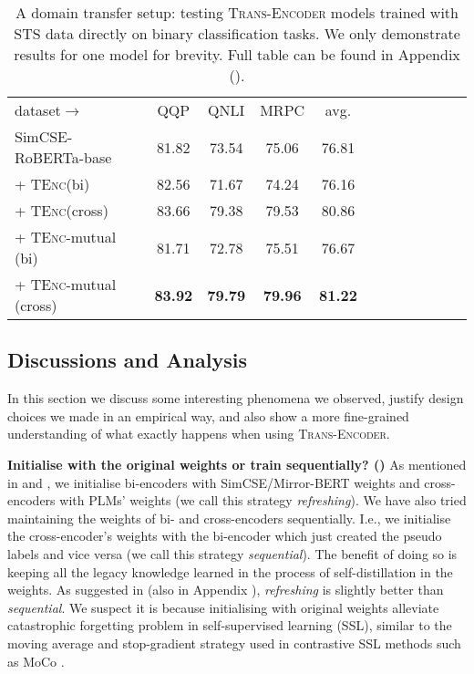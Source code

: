 \documentclass{article} \usepackage{iclr2021_conference,times}
\newcommand{\modelname}{\textsc{Trans-Encoder}\xspace}
\newcommand{\tenc}{\textsc{TEnc}\xspace}
\begin{document}
\begin{table}[!t] \centering
\begin{tabular}{lccccccccccc}
\cmidrule[1.5pt]{1-10}
 dataset$\rightarrow$  & QQP & QNLI & MRPC & avg.\\
\cmidrule[1.0pt]{1-10}
  SimCSE-RoBERTa-base & 81.82 & 73.54 & 75.06 & 76.81  \\
 + \tenc (bi) & 82.56 & 71.67 & 74.24 & 76.16 \\
   + \tenc (cross) & 83.66 & 79.38 & 79.53 & 80.86 \\
    \rowcolor{blue!5}
  + \tenc-mutual (bi) & 81.71 & 72.78 & 75.51 & 76.67 \\
    \rowcolor{blue!5}
 + \tenc-mutual (cross) & \textbf{83.92} & \textbf{79.79} & \textbf{79.96} & \textbf{81.22} \\
  \cmidrule[1.5pt]{1-10}
\end{tabular}
\vspace{-1mm}
\caption{A domain transfer setup: testing \modelname models trained with STS data directly on binary classification tasks. We only demonstrate results for one model for brevity. Full table can be found in Appendix ().}
\label{tab:binary_transfer}
\vspace{-2.0mm}
\end{table}



\subsection{Discussions and Analysis}\label{sec:discuss_and_analysis}

In this section we discuss some interesting phenomena we observed, justify design choices we made in an empirical way, and also show a more fine-grained understanding of what exactly happens when using \modelname. 

\textbf{Initialise with the original weights or train sequentially? ()} As mentioned in  and , we initialise bi-encoders with SimCSE/Mirror-BERT weights and cross-encoders with PLMs' weights (we call this strategy \textit{refreshing}). We have also tried maintaining the weights of bi- and cross-encoders sequentially. I.e., we initialise the cross-encoder's weights with the bi-encoder which just created the pseudo labels and vice versa (we call this strategy \textit{sequential}). The benefit of doing so is keeping all the legacy knowledge learned in the process of self-distillation in the weights. As suggested in  (also in Appendix ), \textit{refreshing} is slightly better than \textit{sequential}. We suspect it is because initialising with original weights alleviate catastrophic forgetting problem in self-supervised learning (SSL), similar to the moving average and stop-gradient strategy used in contrastive SSL methods such as MoCo \citep{he2020momentum}.
\end{document}
